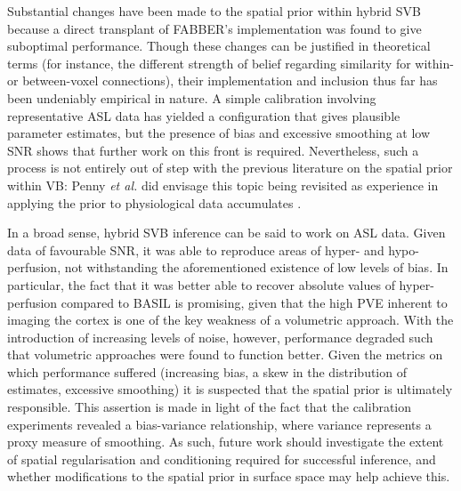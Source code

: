 Substantial changes have been made to the spatial prior within hybrid SVB because a direct transplant of FABBER's implementation was found to give suboptimal performance. Though these changes can be justified in theoretical terms (for instance, the different strength of belief regarding similarity for within- or between-voxel connections), their implementation and inclusion thus far has been undeniably empirical in nature. A simple calibration involving representative ASL data has yielded a configuration that gives plausible parameter estimates, but the presence of bias and excessive smoothing at low SNR shows that further work on this front is required. Nevertheless, such a process is not entirely out of step with the previous literature on the spatial prior within VB: Penny \textit{et al.} did envisage this topic being revisited as experience in applying the prior to physiological data accumulates \cite{Penny2005}. 

In a broad sense, hybrid SVB inference can be said to work on ASL data. Given data of favourable SNR, it was able to reproduce areas of hyper- and hypo-perfusion, not withstanding the aforementioned existence of low levels of bias. In particular, the fact that it was better able to recover absolute values of hyper-perfusion compared to BASIL is promising, given that the high PVE inherent to imaging the cortex is one of the key weakness of a volumetric approach. With the introduction of increasing levels of noise, however, performance degraded such that volumetric approaches were found to function better. Given the metrics on which performance suffered (increasing bias, a skew in the distribution of estimates, excessive smoothing) it is suspected that the spatial prior is ultimately responsible. This assertion is made in light of the fact that the calibration experiments revealed a bias-variance relationship, where variance represents a proxy measure of smoothing. As such, future work should investigate the extent of spatial regularisation and conditioning required for successful inference, and whether modifications to the spatial prior in surface space may help achieve this. 

